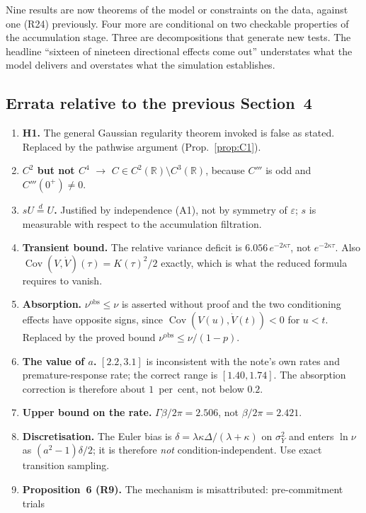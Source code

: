 \documentclass[11pt,a4paper]{article}
\newcommand{\Cov}{\operatorname{Cov}}
\theoremstyle{plain}
\theoremstyle{remark}
\begin{document}
Nine results are now theorems of the model or constraints on the data, against one
(R24) previously. Four more are conditional on two checkable properties of the
accumulation stage. Three are decompositions that generate new tests. The headline
``sixteen of nineteen directional effects come out'' understates what the model delivers
and overstates what the simulation establishes.

\subsection{Errata relative to the previous Section~4}
\label{sec:errata}

\begin{enumerate}
\item \textbf{H1.} The general Gaussian regularity theorem invoked is false as stated.
Replaced by the pathwise argument (Prop.~\ref{prop:C1}).
\item \textbf{$C^2$ but not $C^4$} $\to$ $C\in C^2(\mathbb R)\setminus C^3(\mathbb R)$,
because $C'''$ is odd and $C'''(0^{+})\neq0$.
\item \textbf{$sU\stackrel{d}{=}U$.} Justified by independence (A1), not by symmetry of
$\varepsilon$; $s$ is measurable with respect to the accumulation filtration.
\item \textbf{Transient bound.} The relative variance deficit is $6.056\,e^{-2\kappa\tau}$,
not $e^{-2\kappa\tau}$. Also $\Cov(V,\dot V)(\tau)=K(\tau)^2/2$ exactly, which is what the
reduced formula requires to vanish.
\item \textbf{Absorption.} $\nu^{\text{obs}}\le\nu$ is asserted without proof and the two
conditioning effects have opposite signs, since $\Cov(V(u),\dot V(t))<0$ for $u<t$.
Replaced by the proved bound $\nu^{\text{obs}}\le\nu/(1-p)$.
\item \textbf{The value of $a$.} $[2.2,3.1]$ is inconsistent with the note's own rates and
premature-response rate; the correct range is $[1.40,1.74]$. The absorption correction is
therefore about $1$~per~cent, not below $0.2$.
\item \textbf{Upper bound on the rate.} $\Gamma\beta/2\pi=2.506$, not $\beta/2\pi=2.421$.
\item \textbf{Discretisation.} The Euler bias is $\delta=\lambda\kappa\Delta/(\lambda+\kappa)$
on $\sigma_Y^2$ and enters $\ln\nu$ as $(a^2-1)\delta/2$; it is therefore \emph{not}
condition-independent. Use exact transition sampling.
\item \textbf{Proposition~6 (R9).} The mechanism is misattributed: pre-commitment trials

\end{enumerate}
\end{document}

